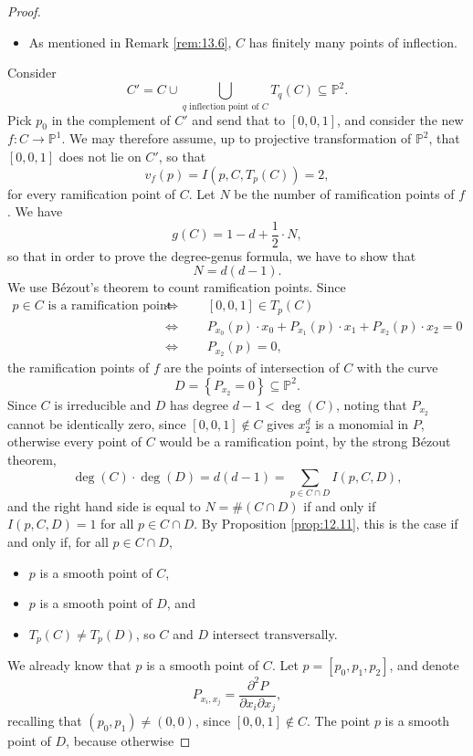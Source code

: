 \documentclass{article}
\renewcommand{\P}{\mathbb{P}}
\newcommand{\rb}[1]{\left( #1 \right)}
\renewcommand{\sb}[1]{\left[ #1 \right]}
\newcommand{\cb}[1]{\left\{ #1 \right\}}
\theoremstyle{definition}\newtheorem{definition}{Definition}[section]
\theoremstyle{definition}\newtheorem{notation}[definition]{Notation}
\theoremstyle{definition}\newtheorem{remark}[definition]{Remark}
\theoremstyle{definition}\newtheorem{example1}[definition]{Example}
\theoremstyle{definition}\newtheorem{fact}{Fact}
\theoremstyle{definition}\newtheorem{exercise}{Exercise}
\theoremstyle{definition}\newtheorem*{example2}{Example}
\begin{document}
\begin{proof}
\begin{itemize}
\item As mentioned in Remark \ref{rem:13.6}, $ C $ has finitely many points of inflection.
\end{itemize}
Consider
$$ C' = C \cup \bigcup_{q \text{ inflection point of } C} T_q\rb{C} \subseteq \P^2. $$
Pick $ p_0 $ in the complement of $ C' $ and send that to $ \sb{0, 0, 1} $, and consider the new $ f : C \to \P^1 $. We may therefore assume, up to projective transformation of $ \P^2 $, that $ \sb{0, 0, 1} $ does not lie on $ C' $, so that
$$ v_f\rb{p} = I\rb{p, C, T_p\rb{C}} = 2, $$
for every ramification point of $ C $. Let $ N $ be the number of ramification points of $ f $. We have
$$ g\rb{C} = 1 - d + \dfrac{1}{2} \cdot N, $$
so that in order to prove the degree-genus formula, we have to show that
$$ N = d\rb{d - 1}. $$
We use B\'ezout's theorem to count ramification points. Since
\begin{align*}
p \in C \text{ is a ramification point} \qquad
& \iff \qquad \sb{0, 0, 1} \in T_p\rb{C} \\
& \iff \qquad P_{x_0}\rb{p} \cdot x_0 + P_{x_1}\rb{p} \cdot x_1 + P_{x_2}\rb{p} \cdot x_2 = 0 \\
& \iff \qquad P_{x_2}\rb{p} = 0,
\end{align*}
the ramification points of $ f $ are the points of intersection of $ C $ with the curve
$$ D = \cb{P_{x_2} = 0} \subseteq \P^2. $$
Since $ C $ is irreducible and $ D $ has degree $ d - 1 < \deg\rb{C} $, noting that $ P_{x_2} $ cannot be identically zero, since $ \sb{0, 0, 1} \notin C $ gives $ x_2^d $ is a monomial in $ P $, otherwise every point of $ C $ would be a ramification point, by the strong B\'ezout theorem,
$$ \deg\rb{C} \cdot \deg\rb{D} = d\rb{d - 1} = \sum_{p \in C \cap D} I\rb{p, C, D}, $$
and the right hand side is equal to $ N = \#\rb{C \cap D} $ if and only if $ I\rb{p, C, D} = 1 $ for all $ p \in C \cap D $. By Proposition \ref{prop:12.11}, this is the case if and only if, for all $ p \in C \cap D $,
\begin{itemize}
\item $ p $ is a smooth point of $ C $,
\item $ p $ is a smooth point of $ D $, and
\item $ T_p\rb{C} \ne T_p\rb{D} $, so $ C $ and $ D $ intersect transversally.
\end{itemize}
We already know that $ p $ is a smooth point of $ C $. Let $ p = \sb{p_0, p_1, p_2} $, and denote
$$ P_{x_i, x_j} = \dfrac{\partial^2 P}{\partial x_i\partial x_j}, $$
recalling that $ \rb{p_0, p_1} \ne \rb{0, 0} $, since $ \sb{0, 0, 1} \notin C $. The point $ p $ is a smooth point of $ D $, because otherwise

\end{proof}
\end{document}
